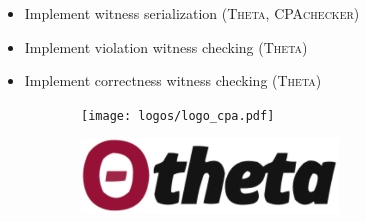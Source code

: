 
\begin{itemize}
    \item Implement witness serialization (\textsc{Theta}, \textsc{CPAchecker})
    \item Implement violation witness checking (\textsc{Theta})
    \item Implement correctness witness checking (\textsc{Theta})
\end{itemize}

\begin{figure}[H]
\centering
\begin{subfigure}{0.5\columnwidth}
\centering
\texttt{[image: logos/logo\_cpa.pdf]}
\end{subfigure}%
\begin{subfigure}{0.5\columnwidth}
            \centering
            
\includegraphics[width=0.75\textwidth]{logos/theta-logo.pdf}
            
\end{subfigure}
\end{figure}